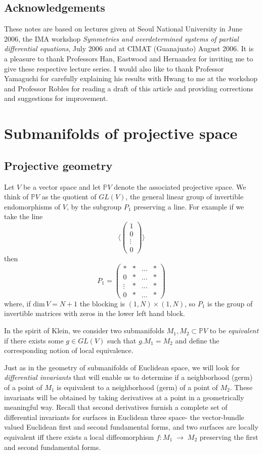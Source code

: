 \documentclass[11pt]{amsart}
\theoremstyle{definition}
\theoremstyle{remark}
\numberwithin{equation}{section}
\def\BP{\mathbb P}
\def\tdim{\rm dim}
\def\ra{{\mathord{\;\rightarrow\;}}}
\def\tdim{\text{dim}\,}
\begin{document}
\subsection*{Acknowledgements} These notes are based on lectures
given at Seoul National University  in June 2006, the IMA
workshop {\it Symmetries and overdetermined systems of partial
differential equations}, July 2006 and at CIMAT (Guanajuato) August 2006. It is a pleasure to thank Professors
Han, Eastwood and Hernandez for inviting me to give these respective lecture
series. I would also like to thank Professor Yamaguchi for carefully
explaining his results with Hwang to me at the workshop and Professor
  Robles for   reading a draft of this article and providing
  corrections and suggestions for improvement.

\section{Submanifolds of projective space}

\subsection{Projective geometry}
Let $V$ be a vector space and let  $\BP V$ denote
the associated projective space. We   think of $\BP V$ as the
quotient of $GL(V)$, the general linear group of
invertible endomorphisms of $V$, by the subgroup $P_1$
preserving a line.
For example if we take the line
$$
\langle \begin{pmatrix} 1\\ 0\\ \vdots\\ 0\end{pmatrix}\rangle
$$
then
$$
P_1=\begin{pmatrix} * & * &\hdots &*\\
0 &*&\hdots &*\\
\vdots &*&\hdots &*\\
0 &*&\hdots &*\end{pmatrix}
$$
where, if $\tdim V=N+1$ the blocking is $(1,N)\times (1,N)$,
so $P_1$ is the group of   invertible matrices with zeros
in the lower left hand block.

In the spirit of Klein, we consider two submanifolds
$M_1,M_2\subset \BP V$ to be  {\it equivalent} if there exists
some $g\in GL(V)$ such that $g.M_1=M_2$ and define the corresponding
notion of local equivalence.

Just as in the geometry of submanifolds of Euclidean
space, we will look for   {\it differential invariants}
that will enable us to determine if a neighborhood (germ) of
a point of $M_1$ is equivalent to a neighborhood (germ) of
a point of $M_2$. These invariants will be obtained by
taking derivatives at a point in a geometrically meaningful way.
Recall that   second derivatives  furnish  a complete set of differential
invariants 
 for surfaces in Euclidean
three space- the vector-bundle valued Euclidean first and
second fundamental forms, and two surfaces are locally
equivalent iff there exists a local diffeomorphism
$f: M_1\ra M_2$  preserving
the first and second fundamental forms.
\end{document}
